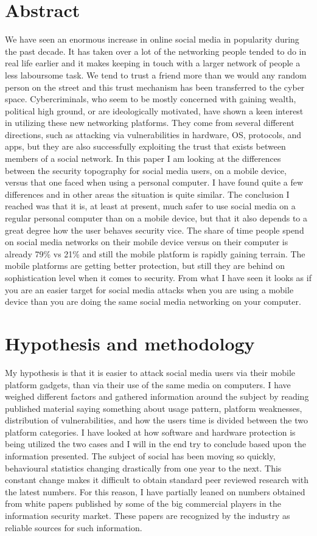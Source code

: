 \section{Abstract}
We have seen an enormous increase in online social media in popularity during the past decade. It has taken over a lot of the networking people tended to do in real life earlier and it makes keeping in touch with a larger network of people a less laboursome task. We tend to trust a friend more than we would any random person on the street and this trust mechanism has been transferred to the cyber space. Cybercriminals, who seem to be mostly concerned with gaining wealth, political high ground, or are ideologically motivated, have shown a keen interest in utilizing these new networking platforms. They come from several different directions, such as attacking via vulnerabilities in hardware, OS, protocols, and apps, but they are also successfully exploiting the trust that exists between members of a social network.
In this paper I am looking at the differences between the security topography for social media users, on a mobile device, versus that one faced when using a personal computer. I have found quite a few differences and in other areas the situation is quite similar. The conclusion I reached was that it is, at least at present, much safer to use social media on a regular personal computer than on a mobile device, but that it also depends to a great degree how the user behaves security vice. The share of time people spend on social media networks on their mobile device versus on their computer is already 79\% vs 21\% \cite{CrossPlatform2016} and still the mobile platform is rapidly gaining terrain. The mobile platforms are getting better protection, but still they are behind on sophistication level when it comes to security. From what I have seen it looks as if you are an easier target for social media attacks when you are using a mobile device than you are doing the same social media networking on your computer.

\section{Hypothesis and methodology}
My hypothesis is that it is easier to attack social media users via their mobile platform gadgets, than via their use of the same media on computers. I have weighed different factors and gathered information around the subject by reading published material saying something about usage pattern, platform weaknesses, distribution of vulnerabilities, and how the users time is divided between the two platform categories. I have looked at how software and hardware protection is being utilized the two cases and I will in the end try to conclude based upon the information presented.
 The subject of social has been moving so quickly, behavioural statistics changing drastically from one year to the next. This constant change makes it difficult to obtain standard peer reviewed research with the latest numbers. For this reason, I have partially leaned on numbers obtained from white papers published by some of the big commercial players in the information security market. These papers are recognized by the industry as reliable sources for such information.
